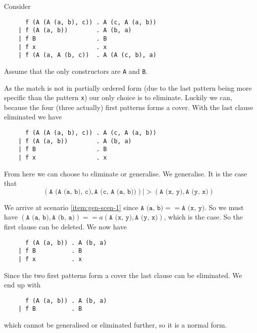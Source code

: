 \begin{example}
Consider
\begin{lstlisting}
      f (A (A (a, b), c)) . A (c, A (a, b))
    | f (A (a, b))        . A (b, a)
    | f B                 . B
    | f x                 . x
    | f (A (a, A (b, c))  . A (A (c, b), a)
\end{lstlisting}
Assume that the only constructors are \texttt{A} and \texttt{B}.

As the match is not in partially ordered form (due to the last pattern being
more specific than the pattern \texttt{x}) our only choice is to
eliminate. Luckily we can, because the four (three actually) first patterns
forms a cover. With the last clause eliminated we have

\begin{lstlisting}
      f (A (A (a, b), c)) . A (c, A (a, b))
    | f (A (a, b))        . A (b, a)
    | f B                 . B
    | f x                 . x
\end{lstlisting}

From here we can choose to eliminate or generalise. We generalise. It is the
case that
\[
(\texttt{A (A (a, b), c)}, \texttt{A (c, A (a, b))}) |> (\texttt{A (x, y)},
\texttt{A (y, x)})
\]

We arrive at scenario \ref{item:gen-scen-1} since $\texttt{A (a, b)} ==
\texttt{A (x, y)}$. So we must have $(\texttt{A (a, b)}, \texttt{A (b, a)}) ==a
(\texttt{A (x, y)}, \texttt{A (y, x)})$, which is the case. So the first clause
can be deleted. We now have

\begin{lstlisting}
      f (A (a, b)) . A (b, a)
    | f B          . B
    | f x          . x
\end{lstlisting}

Since the two first patterns form a cover the last clause can be eliminated. We
end up with

\begin{lstlisting}
      f (A (a, b)) . A (b, a)
    | f B          . B
\end{lstlisting}

which cannot be generalised or eliminated further, so it is a normal form.
\end{example}





